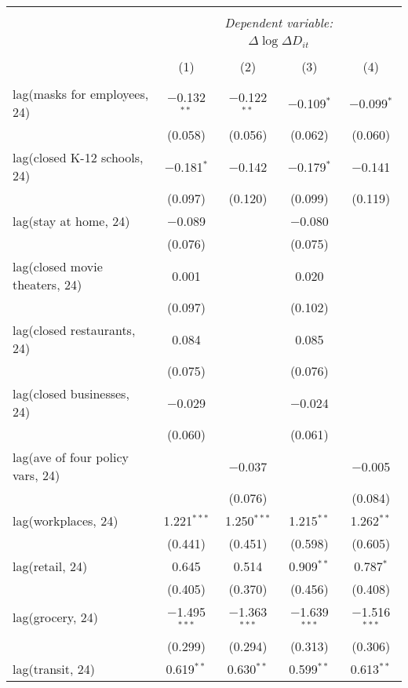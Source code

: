 \begin{tabular}{@{\extracolsep{1pt}}lcccc} 
\\[-1.8ex]\hline 
\hline \\[-1.8ex] 
 & \multicolumn{4}{c}{\textit{Dependent variable:}} \\ 
\cline{2-5} 
 & \multicolumn{4}{c}{$\Delta \log \Delta D_{it}$} \\ 
\\[-1.8ex] & (1) & (2) & (3) & (4)\\ 
\hline \\[-1.8ex] 
 lag(masks for employees, 24) & $-$0.132$^{**}$ & $-$0.122$^{**}$ & $-$0.109$^{*}$ & $-$0.099$^{*}$ \\ 
  & (0.058) & (0.056) & (0.062) & (0.060) \\ 
  lag(closed K-12 schools, 24) & $-$0.181$^{*}$ & $-$0.142 & $-$0.179$^{*}$ & $-$0.141 \\ 
  & (0.097) & (0.120) & (0.099) & (0.119) \\ 
  lag(stay at home, 24) & $-$0.089 &  & $-$0.080 &  \\ 
  & (0.076) &  & (0.075) &  \\ 
  lag(closed movie theaters, 24) & 0.001 &  & 0.020 &  \\ 
  & (0.097) &  & (0.102) &  \\ 
  lag(closed restaurants, 24) & 0.084 &  & 0.085 &  \\ 
  & (0.075) &  & (0.076) &  \\ 
  lag(closed businesses, 24) & $-$0.029 &  & $-$0.024 &  \\ 
  & (0.060) &  & (0.061) &  \\ 
  lag(ave of four policy vars, 24) &  & $-$0.037 &  & $-$0.005 \\ 
  &  & (0.076) &  & (0.084) \\ 
  lag(workplaces, 24) & 1.221$^{***}$ & 1.250$^{***}$ & 1.215$^{**}$ & 1.262$^{**}$ \\ 
  & (0.441) & (0.451) & (0.598) & (0.605) \\ 
  lag(retail, 24) & 0.645 & 0.514 & 0.909$^{**}$ & 0.787$^{*}$ \\ 
  & (0.405) & (0.370) & (0.456) & (0.408) \\ 
  lag(grocery, 24) & $-$1.495$^{***}$ & $-$1.363$^{***}$ & $-$1.639$^{***}$ & $-$1.516$^{***}$ \\ 
  & (0.299) & (0.294) & (0.313) & (0.306) \\ 
  lag(transit, 24) & 0.619$^{**}$ & 0.630$^{**}$ & 0.599$^{**}$ & 0.613$^{**}$ \\ 

\end{tabular}
